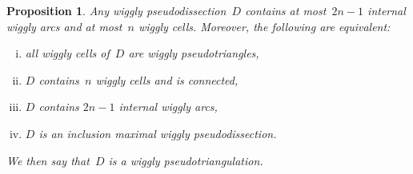 \documentclass{amsart}
\newtheorem{proposition}[theorem]{Proposition}
\theoremstyle{definition}
\newcommand{\darkblue}{\color{darkblue}} %
\newcommand{\defn}[1]{\textsl{\darkblue #1}} %
\begin{document}
\begin{proposition}
\label{prop:wigglyPseudotriangulations}
Any wiggly pseudodissection~$D$ contains at most~$2n-1$ internal wiggly arcs and at most~$n$ wiggly cells.
Moreover, the following are equivalent:
\begin{enumerate}[(i)]
\item all wiggly cells of~$D$ are wiggly pseudotriangles,
\item $D$ contains~$n$ wiggly cells and is connected,
\item $D$ contains $2n-1$ internal wiggly arcs,
\item $D$ is an inclusion maximal wiggly pseudodissection.
\end{enumerate}
We then say that~$D$ is a \defn{wiggly pseudotriangulation}.
\end{proposition}
\end{document}
